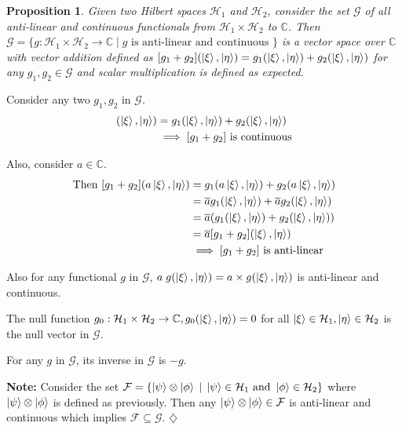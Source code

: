 \documentclass[12pt,twoside,fleqn]{report}
\makeatletter
\theoremstyle{thmstyle}
\renewenvironment{proof}[1][\proofname]{\par
\pushQED{\qed}%
\normalfont \topsep6\p@\@plus6\p@\relax
\trivlist
\item[\hskip\labelsep\itshape#1\@addpunct{.}]\mbox{}\par\nobreak\ignorespaces
}{%
    \popQED\endtrivlist\@endpefalse
    }
\newtheorem{prop}{Proposition}[chapter]
\newenvironment{note}{\textbf{Note:}}{\hfill\ensuremath{\diamondsuit}}
\makeatother
\begin{document}
\begin{prop}
    Given two Hilbert spaces $\mathcal{H}_1$ and $\mathcal{H}_2$, consider the set $\mathcal{G}$ of all anti-linear and continuous functionals from $\mathcal{H}_1 \times \mathcal{H}_2$ to $\mathbb{C}$.
    Then $\mathcal{G} = \{ g: \mathcal{H}_1 \times \mathcal{H}_2 \to \mathbb{C} \; | \; g \text{ is anti-linear and continuous } \}$ is a vector space over $\mathbb{C}$ with vector addition defined as $[ g_1 + g_2] (\ket{\xi}, \ket{\eta}) = g_1(\ket{\xi}, \ket{\eta}) + g_2(\ket{\xi}, \ket{\eta})$ for any $g_1, g_2 \in \mathcal{G}$ and scalar multiplication is defined as expected.
\end{prop}
\begin{proof}

    Consider any two $g_1, g_2$ in $\mathcal{G}$.
    \begin{align*}
        [g_1 + g_2](\ket\xi, \ket\eta) & = g_1(\ket\xi, \ket\eta) + g_2(\ket\xi, \ket\eta)
        \\ & \implies [g_1 + g_2] \text{ is continuous}
    \end{align*}

    Also, consider $a \in \mathbb{C}$. 
    \begin{align*}
        \text{Then }[g_1 + g_2](a \ket\xi, \ket\eta) & = g_1(a \ket\xi, \ket\eta) + g_2(a \ket\xi, \ket\eta)
        \\ & = \overline{a} g_1(\ket\xi, \ket\eta) + \overline{a} g_2(\ket\xi, \ket\eta) 
        \\ & = \overline{a} (g_1(\ket\xi, \ket\eta) + g_2(\ket\xi,\ket\eta))
        \\ & = \overline{a}[g_1 + g_2](\ket\xi, \ket\eta)
        \\ & \implies [g_1 + g_2] \text{ is anti-linear}
    \end{align*}

    Also for any functional $g$ in $\mathcal{G}$, $a \; g(\ket\xi, \ket\eta) = a \times g(\ket\xi, \ket\eta)$ is anti-linear and continuous.

    The null function $g_0 : \mathcal{H}_1 \times \mathcal{H}_2 \to \mathbb{C}, g_0(\ket\xi, \ket\eta) = 0$ for all $\ket\xi \in \mathcal{H}_1, \ket\eta \in \mathcal{H}_2$ is the null vector in $\mathcal{G}$.

    For any $g$ in $\mathcal{G}$, its inverse in $\mathcal{G}$ is $-g$.
\end{proof}

\begin{note}
    Consider the set $\mathcal{F} = \{ \ket\psi \otimes \ket\phi \; | \; \ket\psi \in \mathcal{H}_1 \text{ and } \ket\phi \in \mathcal{H}_2 \}$ where $\ket\psi \otimes \ket\phi$ is defined as previously.
    Then any $\ket\psi \otimes \ket\phi \in \mathcal{F}$ is anti-linear and continuous which implies $\mathcal{F} \subseteq \mathcal{G}$.
\end{note}
\end{document}
